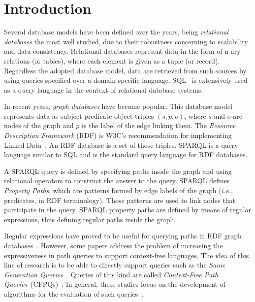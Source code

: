 \documentclass[runningheads]{llncs}
\begin{document}
\section{Introduction}


Several database models have been defined over the years, being \textit{relational da\-ta\-bases} the most well studied, due to their robustness concerning to scalability and data consistency.
Relational databases represent data in the form of n-ary relations (or tables), where each element is given as a tuple (or record).
%
Regardless the adopted database model, data are retrieved from such sources by using queries specified over a  domain-specific language.
SQL~\cite{sql} is extensively used as a query language in the context of relational database systems.

In recent years, \emph{graph databases} have become popular. 
This database model represents data as subject-predicate-object triples $(s, p, o)$, where $s$ and $o$ are nodes of the graph and $p$ is the label of the edge linking them.
The \emph{Resource Description Framework} (RDF) is W3C's recommendation for implementing Linked Data~\cite{w3c-rdf}.
An RDF database is a set of those triples.
%
SPARQL is a query language similar to SQL and is the standard query language for RDF databases.

A SPARQL query is defined by specifying paths inside the graph and using relational operators to construct the answer to the query.
SPARQL defines \emph{Property Paths}, which are patterns formed by edge labels of the graph (\textit{i.e.}, predicates, in RDF terminology).
Those patterns are used to link nodes that participate in the query.
SPARQL property paths are defined by means of regular expressions, thus defining regular paths inside the graph.

Regular expressions have proved to be useful for querying paths in RDF graph da\-ta\-bases~\cite{w3c2012sparql-query-lang}.
However, some papers address the problem of increasing the  expressiveness in path queries to support context-free languages.
The idea of this line of research is to be able to directly support queries such as the \textit{Same Generation Queries}~\cite{abiteboul1995foundations}.
Queries of this kind are called \textit{Context-Free Path Queries}~(CFPQs)~\cite{Hellings14}.
In general, these studies focus on the development of algorithms for the evaluation of such queries~\cite{Hellings14,Hellings2015pathresults,fred,grigorev2016ll,azimov-grigorev2017matrix,MEDEIROS2019}.
\end{document}
